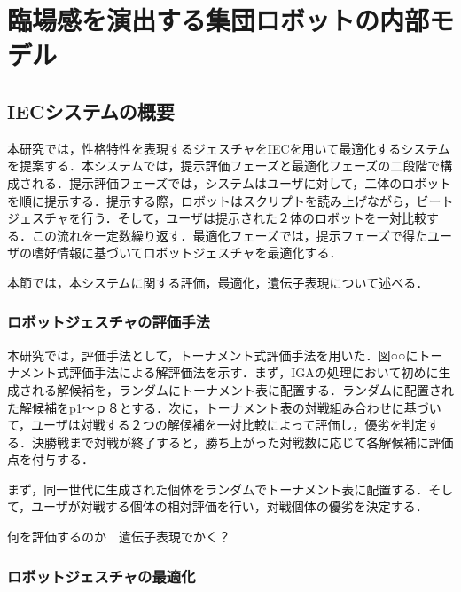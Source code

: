 \chapter{臨場感を演出する集団ロボットの内部モデル}
\thispagestyle{fancy} %
\lhead{}
\chead{}
\rhead{}
\lfoot{} 
\cfoot{\thepage}  
\rfoot{}
%

\section{IECシステムの概要}
\label{sec3.1}


本研究では，性格特性を表現するジェスチャをIECを用いて最適化するシステムを提案する．本システムでは，提示評価フェーズと最適化フェーズの二段階で構成される．提示評価フェーズでは，システムはユーザに対して，二体のロボットを順に提示する．提示する際，ロボットはスクリプトを読み上げながら，ビートジェスチャを行う．そして，ユーザは提示された２体のロボットを一対比較する．この流れを一定数繰り返す．最適化フェーズでは，提示フェーズで得たユーザの嗜好情報に基づいてロボットジェスチャを最適化する．

本節では，本システムに関する評価，最適化，遺伝子表現について述べる．



\subsection{ロボットジェスチャの評価手法}
\label{sec3.1.1}    

本研究では，評価手法として，トーナメント式評価手法を用いた．図○○にトーナメント式評価手法による解評価法を示す．まず，IGAの処理において初めに生成される解候補を，ランダムにトーナメント表に配置する．ランダムに配置された解候補をp1～ｐ８とする．次に，トーナメント表の対戦組み合わせに基づいて，ユーザは対戦する２つの解候補を一対比較によって評価し，優劣を判定する．決勝戦まで対戦が終了すると，勝ち上がった対戦数に応じて各解候補に評価点を付与する．




まず，同一世代に生成された個体をランダムでトーナメント表に配置する．そして，ユーザが対戦する個体の相対評価を行い，対戦個体の優劣を決定する．





何を評価するのか　遺伝子表現でかく？




\subsection{ロボットジェスチャの最適化}
\label{sec3.1.2}


